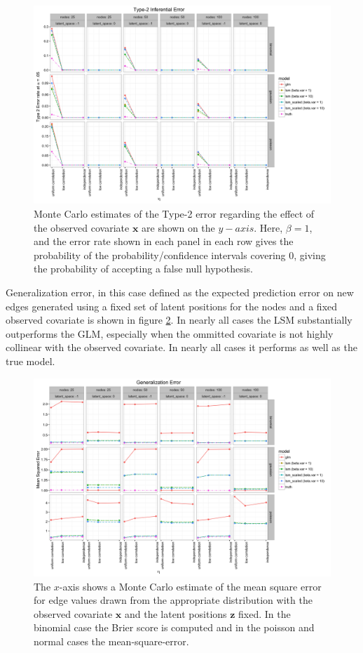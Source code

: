 \documentclass[11pt]{article}
\begin{document}
\begin{figure}
\includegraphics[width=\textwidth]{inference_type_2.png}
\caption{Monte Carlo estimates of the Type-2 error regarding the effect of the observed covariate $\mathbf{x}$ are shown on the $y-axis$. Here, $\beta = 1$, and the error rate shown in each panel in each row gives the probability of the probability/confidence intervals covering $0$, giving the probability of accepting a false null hypothesis. \label{fig:inference_type_2}}
\end{figure}

Generalization error, in this case defined as the expected prediction error on new edges generated using a fixed set of latent positions for the nodes and a fixed observed covariate is shown in figure \ref{fig:generalization}. In nearly all cases the LSM substantially outperforms the GLM, especially when the ommitted covariate is not highly collinear with the observed covariate. In nearly all cases it performs as well as the true model.

\begin{figure}
\includegraphics[width=\textwidth]{generalization.png}
\caption{The $x$-axis shows a Monte Carlo estimate of the mean square error for edge values drawn from the appropriate distribution with the observed covariate $\mathbf{x}$ and the latent positions $\mathbf{z}$ fixed. In the binomial case the Brier score is computed and in the poisson and normal cases the mean-square-error. \label{fig:generalization}}
\end{figure}
\end{document}

